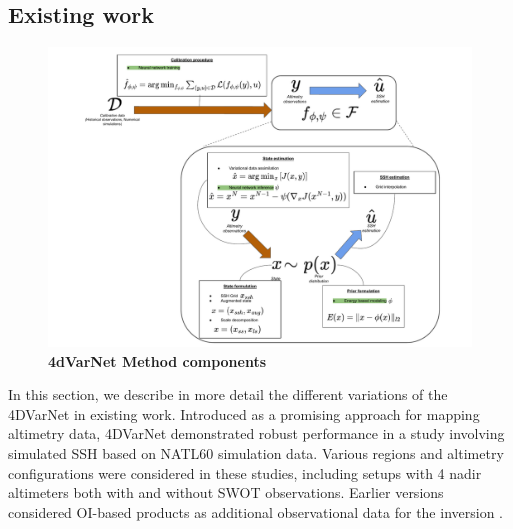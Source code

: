 \begin{bibunit}
\subsection*{Existing work}
\begin{figure}[h]
    \centering
    \includegraphics[width=\textwidth]{00_LitReview/Method-4dvarnet.pdf}
    \caption{\textbf{4dVarNet Method components}}
    \label{c2fig:method4}
\end{figure}
In this section, we describe in more detail the different variations of the 4DVarNet in existing work. 
Introduced as a promising approach for mapping altimetry data, 4DVarNet demonstrated robust performance in a study involving simulated SSH based on NATL60 simulation data\cite{fabletENDTOENDPHYSICSINFORMEDREPRESENTATION2021}. Various regions \cite{beauchamp4DVarNetSSHEndtoendLearning2023} and altimetry configurations were considered in these studies, including setups with 4 nadir altimeters both with and without SWOT observations. Earlier versions considered OI-based products as additional observational data for the inversion \cite{fabletENDTOENDPHYSICSINFORMEDREPRESENTATION2021}.



\end{bibunit}
